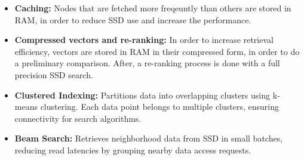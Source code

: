 \begin{itemize}
    \item \textbf{Caching:} Nodes that are fetched more freqeuntly than others are stored in RAM, in order to reduce SSD use and increase the performance.
    \item \textbf{Compressed vectors and re-ranking:} In order to increase retrieval efficiency, vectors are stored in RAM in their compressed form, in order to do a preliminary comparison. After, a re-ranking process is done with a full precision SSD search.
    \item \textbf{Clustered Indexing:} Partitions data into overlapping clusters using k-means clustering. Each data point belongs to multiple clusters, ensuring connectivity for search algorithms.
    \item \textbf{Beam Search:} Retrieves neighborhood data from SSD in small batches, reducing read latencies by grouping nearby data access requests.
\end{itemize}
\clearpage
